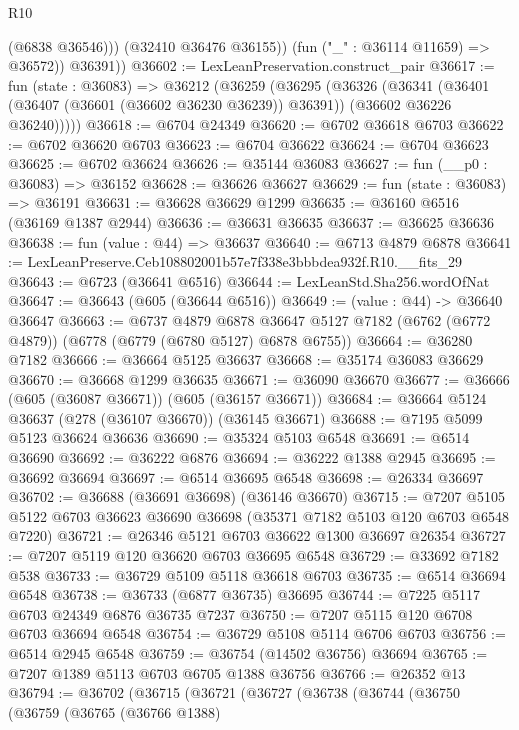 \begin{lexlean}{R10}
\begin{coremodule}
                (@6838 @36546)))
            (@32410 @36476 @36155))
          (fun ("_" : @36114 @11659) => @36572))
        @36391))
@36602 := LexLeanPreservation.construct_pair
@36617 := fun (state : @36083) =>
  @36212
    (@36259
      (@36295
        (@36326
          (@36341
            (@36401 (@36407 (@36601 (@36602 @36230 @36239)) @36391))
            (@36602 @36226 @36240)))))
@36618 := @6704 @24349
@36620 := @6702 @36618 @6703
@36622 := @6702 @36620 @6703
@36623 := @6704 @36622
@36624 := @6704 @36623
@36625 := @6702 @36624
@36626 := @35144 @36083
@36627 := fun (__p0 : @36083) => @36152
@36628 := @36626 @36627
@36629 := fun (state : @36083) => @36191
@36631 := @36628 @36629 @1299
@36635 := @36160 @6516 (@36169 @1387 @2944)
@36636 := @36631 @36635
@36637 := @36625 @36636
@36638 := fun (value : @44) => @36637
@36640 := @6713 @4879 @6878
@36641 := LexLeanPreserve.Ceb108802001b57e7f338e3bbbdea932f.R10.__fits_29
@36643 := @6723 (@36641 @6516)
@36644 := LexLeanStd.Sha256.wordOfNat
@36647 := @36643 (@605 (@36644 @6516))
@36649 := (value : @44) -> @36640 @36647
@36663 := @6737
    @4879
    @6878
    @36647
    @5127
    @7182
    (@6762 (@6772 @4879))
    (@6778 (@6779 (@6780 @5127) @6878 @6755))
@36664 := @36280 @7182
@36666 := @36664 @5125 @36637
@36668 := @35174 @36083 @36629
@36670 := @36668 @1299 @36635
@36671 := @36090 @36670
@36677 := @36666 (@605 (@36087 @36671)) (@605 (@36157 @36671))
@36684 := @36664 @5124 @36637 (@278 (@36107 @36670)) (@36145 @36671)
@36688 := @7195 @5099 @5123 @36624 @36636
@36690 := @35324 @5103 @6548
@36691 := @6514 @36690
@36692 := @36222 @6876
@36694 := @36222 @1388 @2945
@36695 := @36692 @36694
@36697 := @6514 @36695 @6548
@36698 := @26334 @36697
@36702 := @36688 (@36691 @36698) (@36146 @36670)
@36715 := @7207 @5105 @5122 @6703 @36623 @36690 @36698 (@35371 @7182 @5103 @120 @6703 @6548 @7220)
@36721 := @26346 @5121 @6703 @36622 @1300 @36697 @26354
@36727 := @7207 @5119 @120 @36620 @6703 @36695 @6548
@36729 := @33692 @7182 @538
@36733 := @36729 @5109 @5118 @36618 @6703
@36735 := @6514 @36694 @6548
@36738 := @36733 (@6877 @36735) @36695
@36744 := @7225 @5117 @6703 @24349 @6876 @36735 @7237
@36750 := @7207 @5115 @120 @6708 @6703 @36694 @6548
@36754 := @36729 @5108 @5114 @6706 @6703
@36756 := @6514 @2945 @6548
@36759 := @36754 (@14502 @36756) @36694
@36765 := @7207 @1389 @5113 @6703 @6705 @1388 @36756
@36766 := @26352 @13
@36794 := @36702
    (@36715
      (@36721
        (@36727
          (@36738
            (@36744
              (@36750
                (@36759
                  (@36765
                    (@36766 @1388)

\end{coremodule}
\end{lexlean}

